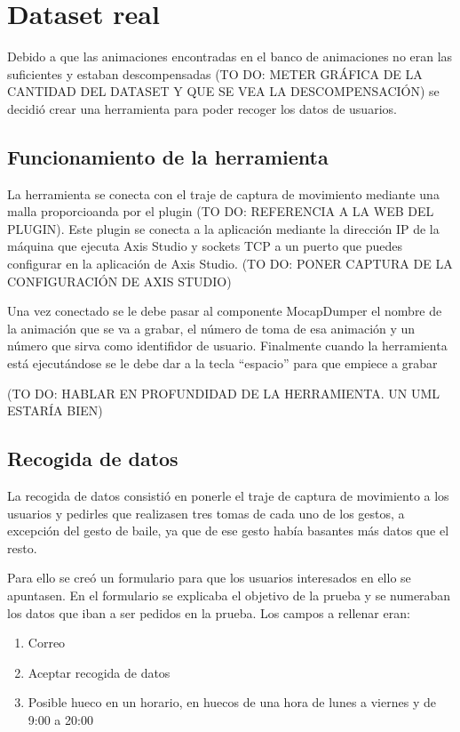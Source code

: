 \section{Dataset real}
\label{sec:datasetReal}
Debido a que las animaciones encontradas en el banco de animaciones no eran las suficientes y estaban descompensadas (TO DO: METER GRÁFICA DE LA CANTIDAD DEL DATASET Y QUE SE VEA LA DESCOMPENSACIÓN) se decidió crear una herramienta para poder recoger los datos de usuarios.

\subsection{Funcionamiento de la herramienta}
La herramienta se conecta con el traje de captura de movimiento mediante una malla proporcioanda por el plugin (TO DO: REFERENCIA A LA WEB DEL PLUGIN).
Este plugin se conecta a la aplicación mediante la dirección IP de la máquina que ejecuta Axis Studio y sockets TCP a un puerto que puedes configurar en la aplicación de Axis Studio. (TO DO: PONER CAPTURA DE LA CONFIGURACIÓN DE AXIS STUDIO)

Una vez conectado se le debe pasar al componente MocapDumper el nombre de la animación que se va a grabar, el número de toma de esa animación y un número que sirva como identifidor de usuario.
Finalmente cuando la herramienta está ejecutándose se le debe dar a la tecla ``espacio'' para que empiece a grabar

(TO DO: HABLAR EN PROFUNDIDAD DE LA HERRAMIENTA. UN UML ESTARÍA BIEN)

\subsection{Recogida de datos}
La recogida de datos consistió en ponerle el traje de captura de movimiento a los usuarios y pedirles que realizasen tres tomas de cada uno de los gestos, a excepción del gesto de baile, ya que de ese gesto había basantes más datos que el resto.

Para ello se creó un formulario para que los usuarios interesados en ello se apuntasen. En el formulario se explicaba el objetivo de la prueba y se numeraban los datos que iban a ser pedidos en la prueba. Los campos a rellenar eran: 

\begin{enumerate}
	\item Correo
	\item Aceptar recogida de datos
	\item Posible hueco en un horario, en huecos de una hora de lunes a viernes y de 9:00 a 20:00
\end{enumerate}

